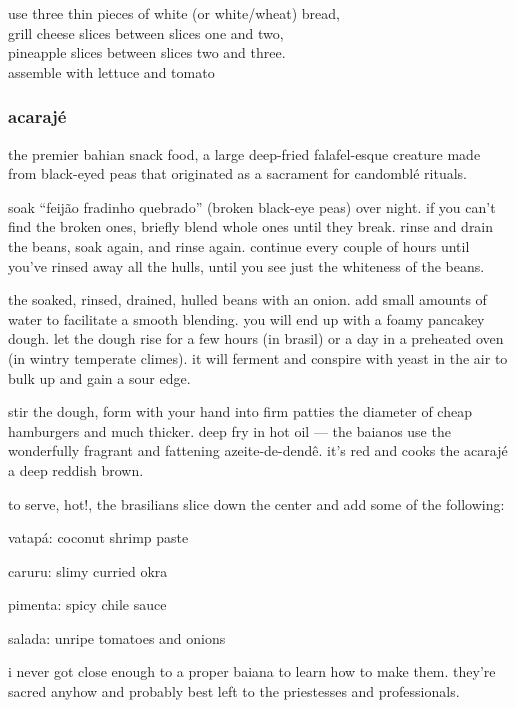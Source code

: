 use three thin pieces of white (or white/wheat) bread,\\
grill cheese slices between slices one and two,\\
pineapple slices between slices two and three.\\
assemble with lettuce and tomato\\

\subsubsection{acaraj\'{e}}

the premier bahian snack food, a large deep-fried falafel-esque
creature made from black-eyed peas that originated as a sacrament for
candombl\'{e} rituals.

soak ``feij\~{a}o fradinho quebrado'' (broken black-eye peas) over
night. if you can't find the broken ones, briefly blend whole ones
until they break.  rinse and drain the beans, soak again, and rinse
again. continue every couple of hours until you've rinsed away all the
hulls, until you see just the whiteness of the beans.

 the soaked, rinsed, drained, hulled beans with an onion. add
small amounts of water to facilitate a smooth blending. you will end
up with a foamy pancakey dough. let the dough rise for a few hours (in
brasil) or a day in a preheated oven (in wintry temperate climes). it
will ferment and conspire with yeast in the air to bulk up and gain a
sour edge.

stir the dough, form with your hand into firm patties the diameter of
cheap hamburgers and much thicker. deep fry in hot oil --- the baianos
use the wonderfully fragrant and fattening azeite-de-dend\^{e}. it's
red and cooks the acaraj\'{e} a deep reddish brown.

to serve, hot!, the brasilians slice down the center and add some of the following:

\begin{ingredients}
  \item vatap\'{a}: coconut shrimp paste
  \item caruru: slimy curried okra
  \item pimenta: spicy chile sauce
  \item salada: unripe tomatoes and onions
\end{ingredients}

i never got close enough to a proper baiana to learn how to make
them. they're sacred anyhow and probably best left to the priestesses
and professionals.

